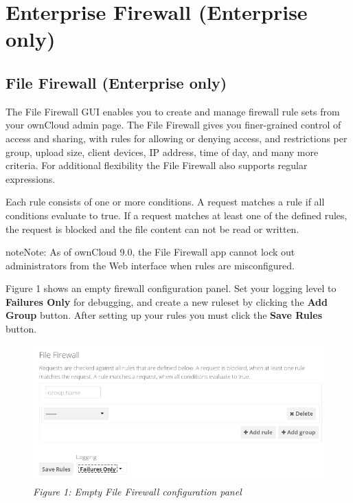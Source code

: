 \documentclass[letterpaper,10pt,english]{sphinxmanual}
\begin{document}
\section{Enterprise Firewall (Enterprise only)}
\label{enterprise_firewall/index::doc}\label{enterprise_firewall/index:enterprise-firewall-enterprise-only}

\subsection{File Firewall (Enterprise only)}
\label{enterprise_firewall/file_firewall::doc}\label{enterprise_firewall/file_firewall:file-firewall-enterprise-only}
The File Firewall GUI enables you to create and manage firewall rule sets from
your ownCloud admin page. The File Firewall gives you finer-grained control of
access and sharing, with rules for allowing or denying access, and restrictions
per group, upload size, client devices, IP address, time of day, and many more
criteria. For additional flexibility the File Firewall also supports regular
expressions.

Each rule consists of one or more conditions. A request matches a rule if
all conditions evaluate to true. If a request matches at least one of the
defined rules, the request is blocked and the file content can not be read or
written.

\begin{notice}{note}{Note:}
As of ownCloud 9.0, the File Firewall app cannot lock out administrators from the Web interface when      rules are misconfigured.
\end{notice}

Figure 1 shows an empty firewall configuration panel. Set your logging level to
\textbf{Failures Only} for debugging, and create a new ruleset by clicking the \textbf{Add
Group} button. After setting up your rules you must click the \textbf{Save Rules}
button.
\begin{figure}[htbp]
\centering
\capstart

\includegraphics{firewall-1.png}
\caption{\emph{Figure 1: Empty File Firewall configuration panel}}\end{figure}
\end{document}
